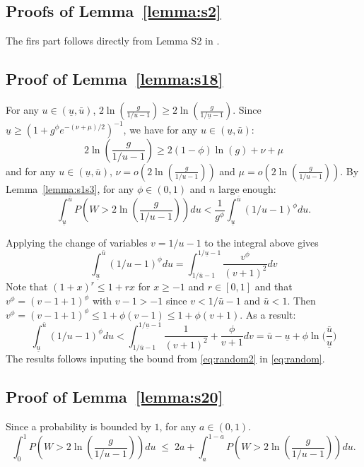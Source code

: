 \documentclass[aos]{imsart}
\theoremstyle{plain}
\begin{document}
\begin{supplement}
\subsection{Proofs of Lemma~\ref{lemma:s2}}
The firs part follows directly from Lemma S2 in \cite{rossell2022concentration}.

\subsection{Proof of Lemma~\ref{lemma:s18}}
For any $u\in (\underline{u},\bar{u})$, $2\ln \left(\frac{g}{1 / u-1}\right) \geq 2\ln \left(\frac{g}{1 / \underline{u}-1}\right)$. Since $\underline{u}\geq (1+g^{\phi}e^{-(\nu+\mu)/2})^{-1}$,  we have for any $u\in (\underline{u},\bar{u})$:
$$2\ln \left(\frac{g}{1 / u-1}\right) \geq 2(1-\phi)\ln(g)+\nu+\mu $$
and for any $u\in (\underline{u},\bar{u})$, $\nu=o\left(2\ln \left(\frac{g}{1 / u-1}\right)\right)$ and $\mu=o\left(2\ln \left(\frac{g}{1 / u-1}\right)\right)$. By Lemma~\ref{lemma:s1s3}, for any $\phi\in(0,1)$ and $n$ large enough:
\begin{equation}\label{eq:random}
    \int_{\underline{u}}^{\bar{u}} P\left(W>2\ln \left(\frac{g}{1 / u-1}\right)\right) d u< \frac{1}{g^{\phi}} \int_{\underline{u}}^{\bar{u}}(1 / u-1)^{\phi} d u .
\end{equation}

Applying the change of variables $v=1 / u-1$ to the integral above gives
$$
\int_{\underline{u}}^{\bar{u}}(1 / u-1)^{\phi} d u=\int_{1 / \bar{u}-1}^{1 / \underline{u}-1} \frac{v^{\phi}}{(v+1)^2} d v
$$
Note that $(1+x)^r \leq 1+r x$  for $x \geq-1$ and $r\in[0,1]$ and that $v^{\phi}=(v-1 + 1)^{\phi}$ with $v-1>-1$ since $v<1 / \bar{u}-1$ and $\bar{u}<1$. Then $v^{\phi}=(v-1 + 1)^{\phi}\leq 1 + \phi (v-1)\leq 1 + \phi(v+1)$. As a result:
\begin{equation}\label{eq:random2}
\int_{\underline{u}}^{\bar{u}}(1 / u-1)^{\phi} d u<\int_{1 / \bar{u}-1}^{1 / \underline{u}-1} \frac{1}{(v+1)^2} +\frac{\phi}{v+1} d v = \bar{u}-\underline{u}+\phi\ln\Big(\frac{\bar{u}}{\underline{u}}\Big)
\end{equation}
The results follows inputing the bound from \eqref{eq:random2} in \eqref{eq:random}.


\subsection{Proof of Lemma~\ref{lemma:s20}}
Since a probability is bounded by $1$, for any $a\in(0,1)$.
\begin{equation}\label{eq:basebound}
    \int_0^1 P\left(W>2 \ln \left(\frac{g}{1 / u-1}\right)\right) d u \;\leq\; 2 a+\int_{a}^{1-a} P\left(W>2\ln\left(\frac{g}{1 / u-1}\right)\right) d u.
\end{equation}


\end{supplement}
\end{document}
